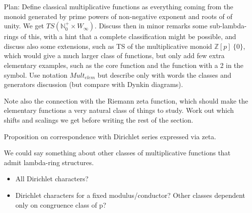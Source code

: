 Plan: Define classical multiplicative functions as everything coming from the monoid generated by prime powers of non-negative exponent and roots of of unity. We get $TS(\mathbb{N}_0^{+} \times W_{\infty})$. Discuss then in minor remarks some sub-lambda-rings of this, with a hint that a complete classification might be possible, and discuss also some extensions, such as TS of the multiplicative monoid $\mathbb{Z}[p] \ \{0\}$, which would give a much larger class of functions, but only add few extra elementary examples, such as the core function and the function with a 2 in the symbol. Use notation $Mult_{elem}$ but describe only with words the classes and generators discussion (but compare with Dynkin diagrams). 

Note also the connection with the Riemann zeta function, which should make the elementary functions a very natural class of things to study. Work out which shifts and scalings we get before writing the rest of the section.




Proposition on correspondence with Dirichlet series expressed via zeta.

We could say something about other classes of multiplicative functions that admit lambda-ring structures.  
\begin{itemize}
\item All Dirichlet characters?
\item Dirichlet characters for a fixed modulus/conductor? Other classes dependent only on congruence class of p?
\end{itemize}


